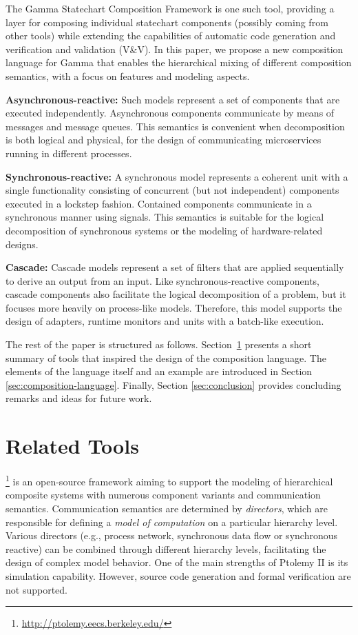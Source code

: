 The Gamma Statechart Composition Framework is one such tool, providing a layer for composing individual statechart components (possibly coming from other tools) while extending the capabilities of automatic code generation and verification and validation (V\&V). In this paper, we propose a new composition language for Gamma that enables the hierarchical mixing of different composition semantics, with a focus on features and modeling aspects.

\textbf{Asynchronous-reactive:} Such models represent a set of components that are executed independently. Asynchronous components communicate by means of messages and message queues. This semantics is convenient when decomposition is both logical and physical, \eg for the design of communicating microservices running in different processes.
	
\textbf{Synchronous-reactive:} A synchronous model represents a coherent unit with a single functionality consisting of concurrent (but not independent) components executed in a lockstep fashion. Contained components communicate in a synchronous manner using signals. This semantics is suitable for the logical decomposition of synchronous systems or the modeling of hardware-related designs.
	
\textbf{Cascade:} Cascade models represent a set of filters that are applied sequentially to derive an output from an input. Like synchronous-reactive components, cascade components also facilitate the logical decomposition of a problem, but it focuses more heavily on process-like models. Therefore, this model supports the design of adapters, runtime monitors and units with a batch-like execution.

The rest of the paper is structured as follows. Section~\ref{sec:related-tools} presents a short summary of tools that inspired the design of the composition language. The elements of the language itself and an example are introduced in Section \ref{sec:composition-language}. Finally, Section \ref{sec:conclusion} provides concluding remarks and ideas for future work.

\section{Related Tools}
\label{sec:related-tools}

\ptolemy\footnote{\url{http://ptolemy.eecs.berkeley.edu/}} \cite{ptolemy,ptolemy2} is an open-source framework aiming to support
the modeling of hierarchical composite systems with numerous component variants and communication semantics. Communication semantics are determined by \emph{directors}, which are responsible for defining a \emph{model of computation} on a particular hierarchy level. Various directors (e.g., process network, synchronous data flow
or synchronous reactive) can be combined through different hierarchy levels, facilitating the design of complex model behavior. One of the main strengths of Ptolemy II is its simulation capability. However, source code generation and formal verification are not supported.

